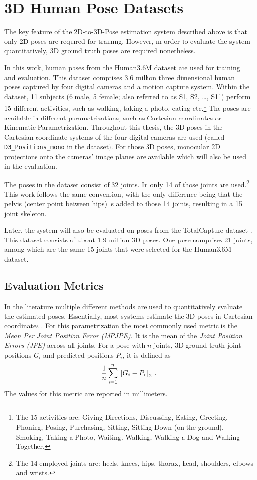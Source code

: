 \section{3D Human Pose Datasets}
\label{sec:data}

The key feature of the 2D-to-3D-Pose estimation system described above is that only 2D poses are required for training.
However, in order to evaluate the system quantitatively, 3D ground truth poses are required nonetheless.

In this work, human poses from the Human3.6M dataset \cite{ionescu14} are used for training and evaluation.
This dataset comprises 3.6 million three dimensional human poses captured by four digital cameras and a motion capture system.
Within the dataset, 11 subjects (6 male, 5 female; also referred to as S1, S2, \dots, S11) perform 15 different activities, such as walking, taking a photo, eating etc.\footnote{
	The 15 activities are: Giving Directions, Discussing, Eating, Greeting, Phoning, Posing, Purchasing, Sitting, Sitting Down (on the ground), Smoking, Taking a Photo, Waiting, Walking, Walking a Dog and Walking Together.
}
The poses are available in different parametrizations, such as Cartesian coordinates or Kinematic Parametrization.
Throughout this thesis, the 3D poses in the Cartesian coordinate systems of the four digital cameras are used (called \texttt{D3\_Positions\_mono} in the dataset).
For those 3D poses, monocular 2D projections onto the cameras' image planes are available which will also be used in the evaluation.

The poses in the dataset consist of 32 joints.
In \cite{drover18} only 14 of those joints are used.\footnote{
The 14 employed joints are: heels, knees, hips, thorax, head, shoulders, elbows and wrists.
}
This work follows the same convention, with the only difference being that the pelvis (center point between hips) is added to those 14 joints, resulting in a 15 joint skeleton.

Later, the system will also be evaluated on poses from the TotalCapture dataset \cite{trumble17}.
This dataset consists of about 1.9 million 3D poses.
One pose comprises 21 joints, among which are the same 15 joints that were selected for the Human3.6M dataset.

\subsection{Evaluation Metrics}
In the literature multiple different methods are used to quantitatively evaluate the estimated poses. 
Essentially, most systems estimate the 3D poses in Cartesian coordinates \cite{drover18, chen17, bogo16, grinciunaite16, yasin16, wandt19, tome17, tekin16, tekin17, pavlakos17}.
For this parametrization the most commonly used metric is the \emph{Mean Per Joint Position Error (MPJPE)}.
It is the mean of the \emph{Joint Position Errors (JPE)} across all joints.
For a pose with $n$ joints, 3D ground truth joint positions $G_i$ and predicted positions $P_i$, it is defined as
\begin{equation}
\frac{1}{n} \sum_{i = 1}^{n}  \norm{G_i - P_i}_2 \ .
\end{equation}
The values for this metric are reported in millimeters.

